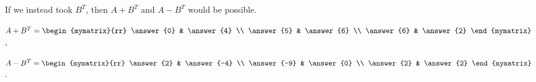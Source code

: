 \documentclass{ximera}
\begin{document}
\begin{problem}
\begin{enumerate}
\begin{sol}
      If we instead took $B^T$, then $A+B^T$ and $A-B^T$ would be possible.

      $A+B^T = \begin{mymatrix}{rr}
        \answer{0} & \answer{4}  \\
        \answer{5} & \answer{6}  \\
        \answer{6} & \answer{2} 
      \end{mymatrix}$,\quad

      $A-B^T = \begin{mymatrix}{rr}
        \answer{2} & \answer{-4}  \\
        \answer{-9} & \answer{0}  \\
        \answer{2} & \answer{2} 
      \end{mymatrix}$.



      \end{sol}

  \end{enumerate}
\end{problem}
\end{document}
